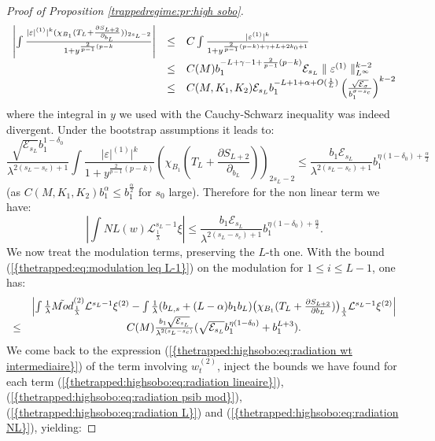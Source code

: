\documentclass[11pt,a4paper,reqno]{amsart}
\theoremstyle{remark}
\numberwithin{equation}{section}
\begin{document}
\begin{proof}[Proof of Proposition \ref{trappedregime:pr:high sobo}]
$$
\begin{array}{r c l}
\left| \int \frac{|\varepsilon|^{(1)}|^k(\chi_{B_1}(T_L+\frac{\partial S_{L+2}}{\partial_{b_L}}))_{2s_L-2}}{1+y^{\frac{2}{p-1}(p-k}} \right|&\leq& C\int \frac{|\varepsilon^{(1)}|^k}{1+y^{\frac{2}{p-1}(p-k)+\gamma+L+2k_0+1}} \\
&\leq& C(M)b_1^{-L+\gamma-1+\frac{2}{p-1}(p-k)}\mathcal{E}_{s_L}\parallel \varepsilon^{(1)} \parallel_{L^{\infty}}^{k-2} \\
&\leq & C(M,K_1,K_2)\mathcal{E}_{s_L}b_1^{-L+1+\alpha+O(\frac{1}{L})}\left(\frac{\sqrt{\mathcal{E}_{\sigma}}}{b_1^{\sigma-s_c}}\right)^{k-2}
\end{array}
$$
where the integral in $y$ we used with the Cauchy-Schwarz inequality was indeed divergent.
Under the bootstrap assumptions it leads to:
$$
\frac{\sqrt{\mathcal{E}_{s_L}}b_1^{1-\delta_0}}{\lambda^{2(s_L-s_c)+1}}\int \frac{|\varepsilon|^{(1)}|^k}{1+y^{\frac{2}{p-1}(p-k)}} (\chi_{B_1}(T_L+\frac{\partial S_{L+2}}{\partial_{b_L}}))_{2s_L-2}
\leq \frac{b_1\mathcal{E}_{s_L}}{\lambda^{2(s_L-s_c)+1}}b_1^{\eta(1-\delta_0)+\frac{\alpha}{2}} 
$$
(as $C(M,K_1,K_2)b_1^{\alpha}\leq b_1^{\frac{\alpha}{2}}$ for $s_0$ large). Therefore for the non linear term we have:
\begin{equation} \label{thetrapped:highsobo:eq:radiation NL}
\left| \int NL(w) \mathcal{L}_{\frac{1}{\lambda}}^{s_L-1} \xi \right| \leq \frac{b_1\mathcal{E}_{s_L}}{\lambda^{2(s_L-s_c)+1}}b_1^{\eta(1-\delta_0)+\frac{\alpha}{2}}.
\end{equation}
We now treat the modulation terms, preserving the $L$-th one. With the bound {{\rm (\ref{{thetrapped:eq:modulation leq L-1}})}} on the modulation for $1\leq i \leq L-1$, one has:
\begin{equation} \label{thetrapped:highsobo:eq:radiation mod}
\begin{array}{r c l}
&\left| \int \frac{1}{\lambda} \tilde{Mod}^{(2)}_{\frac{1}{\lambda}}\mathcal{L}^{s_L-1} \xi ^{(2)} - \int \frac{1}{\lambda} (b_{L,s}+(L-\alpha)b_1b_L)\bigl{(}\chi_{B_1}(T_L+\frac{\partial S_{L+2}}{\partial b_L}) \bigr{)}_{\frac{1}{\lambda}}\mathcal{L}^{s_L-1} \xi ^{(2)} \right| \\
\leq & C(M)\frac{b_1\sqrt{\mathcal{E}_{s_L}}}{\lambda^{2(s_L-s_c)}}(\sqrt{\mathcal{E}_{s_L}}b_1^{\eta(1-\delta_0)}+b_1^{L+3}).
\end{array}
\end{equation}
We come back to the expression {{\rm (\ref{{thetrapped:highsobo:eq:radiation wt intermediaire}})}} of the term involving $w_t^{(2)}$, inject the bounds we have found for each term {{\rm (\ref{{thetrapped:highsobo:eq:radiation lineaire}})}}, {{\rm (\ref{{thetrapped:highsobo:eq:radiation psib mod}})}}, {{\rm (\ref{{thetrapped:highsobo:eq:radiation L}})}} and {{\rm (\ref{{thetrapped:highsobo:eq:radiation NL}})}}, yielding:

\end{proof}
\end{document}

